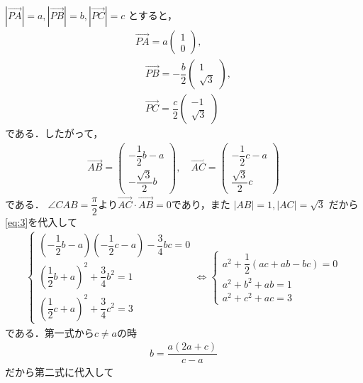 \documentclass[../../main.tex]{subfiles}
\begin{document}
$|\overrightarrow{PA}| = a, |\overrightarrow{PB}| = b, |\overrightarrow{PC}| = c$ とすると，
\begin{align}
  \overrightarrow{PA} = a
  \begin{pmatrix} 1 \\ 0
  \end{pmatrix}, \\
  \quad \overrightarrow{PB} = -\dfrac{b}{2}
  \begin{pmatrix} 1 \\ \sqrt{3}
  \end{pmatrix}, \\
  \quad \overrightarrow{PC} = \dfrac{c}{2}
  \begin{pmatrix} -1 \\ \sqrt{3}
  \end{pmatrix}
\end{align}
である．したがって，
\begin{align}
  \overrightarrow{AB} =
  \begin{pmatrix} -\dfrac{1}{2}b - a \\ -\dfrac{\sqrt{3}}{2}b
  \end{pmatrix},
  \quad \overrightarrow{AC} =
  \begin{pmatrix} -\dfrac{1}{2}c - a \\ \dfrac{\sqrt{3}}{2}c
  \end{pmatrix} \label{eq:3}
\end{align}
である．
$\angle CAB = \dfrac{\pi}{2}$より$\overrightarrow{AC}\cdot \overrightarrow{AB} = 0$であり，また $|AB| = 1, |AC| = \sqrt{3}$ だから\cref{eq:3}を代入して
\begin{align}
  \begin{cases}
    (-\dfrac{1}{2}b - a)(-\dfrac{1}{2}c - a) - \dfrac{3}{4}bc = 0 \\
    (\dfrac{1}{2}b + a)^2 + \dfrac{3}{4}b^2 = 1 \\
    (\dfrac{1}{2}c + a)^2 + \dfrac{3}{4}c^2 = 3
  \end{cases}
  \iff
  \begin{cases}
    a^2 + \dfrac{1}{2}(ac + ab - bc) = 0 \\
    a^2 + b^2 + ab = 1 \\
    a^2 + c^2 + ac = 3
  \end{cases} \label{eq:4}
\end{align}
である．第一式から$c\neq a$の時
\begin{align}
  b = \dfrac{a(2a+c)}{c-a} \label{eq:5}
\end{align}
だから第二式に代入して
\end{document}
